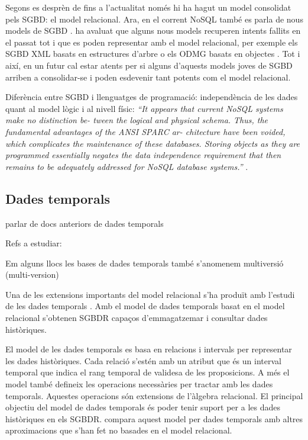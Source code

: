Segons es desprèn de \textcite{date06} fins a l'actualitat només hi ha
hagut un model consolidat pels SGBD: el model relacional.  Ara, en el
corrent NoSQL també es parla de nous models de
SGBD \parencite{edlich:nosql,stonebraker09:scidb}.
\citeauthor{date06} ha avaluat que alguns nous models recuperen
intents fallits en el passat tot i que es poden representar amb el
model relacional, per exemple els SGBD XML basats en estructures
d'arbre \parencite[cap.~14]{date06} \parencite[cap.~27]{date04:introduction8}
o els ODMG basats en objectes \parencite[cap.~27]{date06}. Tot i així,
en un futur cal estar atents per si alguns d'aquests models joves de
SGBD arriben a consolidar-se i poden esdevenir tant potents com el
model relacional.


\todo{}
Diferència entre SGBD i llenguatges de programació: independència de les dades quant al model lògic i al nivell físic: \emph{``It appears that
current NoSQL systems make no distinction be-
tween the logical and physical schema. Thus, the
fundamental advantages of the ANSI SPARC ar-
chitecture have been voided, which complicates the
maintenance of these databases. Storing objects as
they are programmed essentially negates the data
independence requirement that then remains to be
adequately addressed for NoSQL database systems.''}  \textcite{atzeni13:relational_model_dead}.




\subsection{Dades temporals}

parlar de docs anteriors de dades temporals

Refs a estudiar:

\cite{jensen99:temporaldata}
\cite{jensen00:thesis}
\cite{jensen98:temporal_database_glossary}
\cite{tansel93:temporal_databases}


Em alguns llocs les bases de dades temporals també s'anomenem multiversió (multi-version)


Una de les extensions importants del model relacional s'ha produït amb
l'estudi de les dades
temporals \parencite{date02:_tempor_data_relat_model}. Amb el model de
dades temporals basat en el model relacional s'obtenen SGBDR capaços
d'emmagatzemar i consultar dades històriques.

El model de les dades
temporals \parencite{date02:_tempor_data_relat_model} es basa en
relacions i intervals per representar les dades històriques. Cada
relació s'estén amb un atribut que és un interval temporal que indica
el rang temporal de validesa de les proposicions. A més el model també
defineix les operacions necessàries per tractar amb les dades
temporals. Aquestes operacions són extensions de l'àlgebra relacional.
El principal objectiu del model de dades temporals és poder tenir
suport per a les dades històriques en els SGBDR.
\textcite[cap.~28]{date06} compara aquest model per dades temporals
amb altres aproximacions que s'han fet no basades en el model
relacional.



